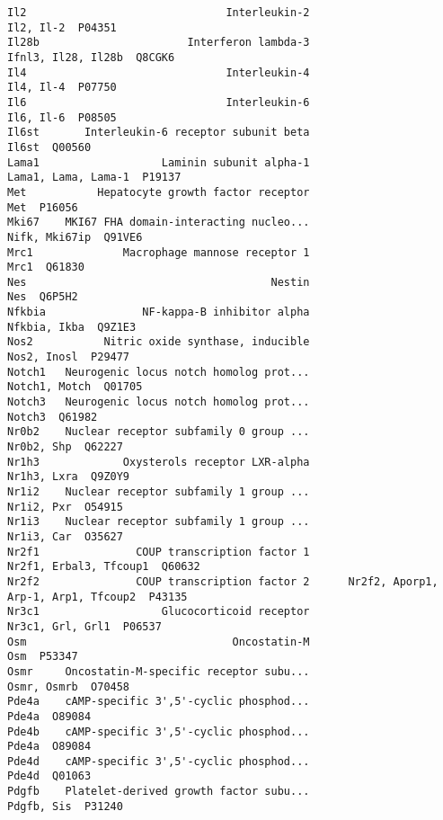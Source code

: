 \documentclass[]{article}
\begin{document}
\begin{verbatim}
Il2                               Interleukin-2                                Il2, Il-2  P04351
Il28b                       Interferon lambda-3                       Ifnl3, Il28, Il28b  Q8CGK6
Il4                               Interleukin-4                                Il4, Il-4  P07750
Il6                               Interleukin-6                                Il6, Il-6  P08505
Il6st       Interleukin-6 receptor subunit beta                                    Il6st  Q00560
Lama1                   Laminin subunit alpha-1                      Lama1, Lama, Lama-1  P19137
Met           Hepatocyte growth factor receptor                                      Met  P16056
Mki67    MKI67 FHA domain-interacting nucleo...                            Nifk, Mki67ip  Q91VE6
Mrc1              Macrophage mannose receptor 1                                     Mrc1  Q61830
Nes                                      Nestin                                      Nes  Q6P5H2
Nfkbia               NF-kappa-B inhibitor alpha                             Nfkbia, Ikba  Q9Z1E3
Nos2           Nitric oxide synthase, inducible                              Nos2, Inosl  P29477
Notch1   Neurogenic locus notch homolog prot...                            Notch1, Motch  Q01705
Notch3   Neurogenic locus notch homolog prot...                                   Notch3  Q61982
Nr0b2    Nuclear receptor subfamily 0 group ...                               Nr0b2, Shp  Q62227
Nr1h3             Oxysterols receptor LXR-alpha                              Nr1h3, Lxra  Q9Z0Y9
Nr1i2    Nuclear receptor subfamily 1 group ...                               Nr1i2, Pxr  O54915
Nr1i3    Nuclear receptor subfamily 1 group ...                               Nr1i3, Car  O35627
Nr2f1               COUP transcription factor 1                   Nr2f1, Erbal3, Tfcoup1  Q60632
Nr2f2               COUP transcription factor 2      Nr2f2, Aporp1, Arp-1, Arp1, Tfcoup2  P43135
Nr3c1                   Glucocorticoid receptor                         Nr3c1, Grl, Grl1  P06537
Osm                                Oncostatin-M                                      Osm  P53347
Osmr     Oncostatin-M-specific receptor subu...                              Osmr, Osmrb  O70458
Pde4a    cAMP-specific 3',5'-cyclic phosphod...                                    Pde4a  O89084
Pde4b    cAMP-specific 3',5'-cyclic phosphod...                                    Pde4a  O89084
Pde4d    cAMP-specific 3',5'-cyclic phosphod...                                    Pde4d  Q01063
Pdgfb    Platelet-derived growth factor subu...                               Pdgfb, Sis  P31240

\end{verbatim}
\end{document}
